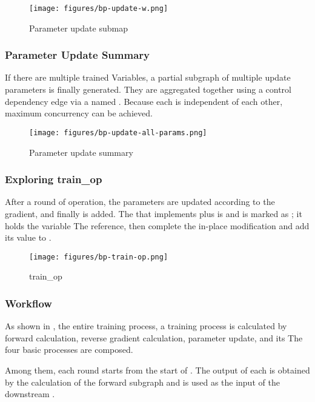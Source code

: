 \begin{content}
\begin{figure}[!h]
  \centering
  \texttt{[image: figures/bp-update-w.png]}
  \caption{Parameter update submap}
  \label{fig:bp-update-w}
\end{figure}


\subsubsection{Parameter Update Summary}
If there are multiple trained Variables, a partial subgraph of multiple update parameters is finally generated. They are aggregated together using a control dependency edge via a  named . Because each  is independent of each other, maximum concurrency can be achieved.

\begin{figure}[!h]
  \centering
  \texttt{[image: figures/bp-update-all-params.png]}
  \caption{Parameter update summary}
  \label{fig:bp-update-all-params}
\end{figure}


\subsubsection{Exploring train\_op}
After a round of  operation, the parameters are updated according to the gradient, and finally  is added. The  that implements  plus  is  and is marked as ; it holds the  variable The reference, then complete the in-place modification and add its value to .

\begin{figure}[!h]
  \centering
  \texttt{[image: figures/bp-train-op.png]}
  \caption{train\_op}
  \label{fig:bp-train-op}
\end{figure}


\subsubsection{Workflow}
As shown in , the entire training process, a  training process is calculated by forward calculation, reverse gradient calculation, parameter update, and its  The four basic processes are composed.

Among them, each round  starts from the start of . The output of each  is obtained by the calculation of the forward subgraph and is used as the input of the downstream .


\end{content}
